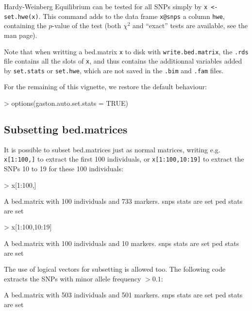 \documentclass{article}
\renewenvironment{Schunk}{\vspace{\topsep}}{\vspace{\topsep}}
\begin{document}
  Hardy-Weinberg Equilibrium can be tested for all SNPs simply by \verb!x <- set.hwe(x)!. 
  This command adds to the data frame \verb!x@snps! a column \verb!hwe!, containing the
  $p$-value of the test (both $\chi^2$ and ``exact'' tests are available, see the man
  page).

  Note that when writting a bed.matrix \verb!x! to disk with \verb!write.bed.matrix!, 
  the \verb!.rds! file contains all the slots of \verb!x!, and thus contains the additionnal
  variables added by \verb!set.stats! or \verb!set.hwe!, which are not saved in the
  \verb!.bim! and \verb!.fam! files.

  For the remaining of this vignette, we restore the default behaviour:
\begin{Schunk}
\begin{Sinput}
> options(gaston.auto.set.stats = TRUE)
\end{Sinput}
\end{Schunk}

\pagebreak
\subsection{Subsetting bed.matrices}

  It is possible to subset bed.matrices just as normal matrices, writing e.g.
  \verb!x[1:100,]! to extract the first 100 individuals, or \verb!x[1:100,10:19]!
  to extract the SNPs 10 to 19 for these 100 individuals:

\begin{Schunk}
\begin{Sinput}
> x[1:100,]
\end{Sinput}
\begin{Soutput}
A bed.matrix with 100 individuals and 733 markers.
snps stats are set
ped stats are set
\end{Soutput}
\begin{Sinput}
> x[1:100,10:19]
\end{Sinput}
\begin{Soutput}
A bed.matrix with 100 individuals and 10 markers.
snps stats are set
ped stats are set
\end{Soutput}
\end{Schunk}

  The use of logical vectors for subsetting is allowed too. The following code extracts 
  the SNPs with minor allele frequency $> 0.1$:

\begin{Schunk}
\begin{Soutput}
A bed.matrix with 503 individuals and 501 markers.
snps stats are set
ped stats are set
\end{Soutput}
\end{Schunk}
\end{document}
